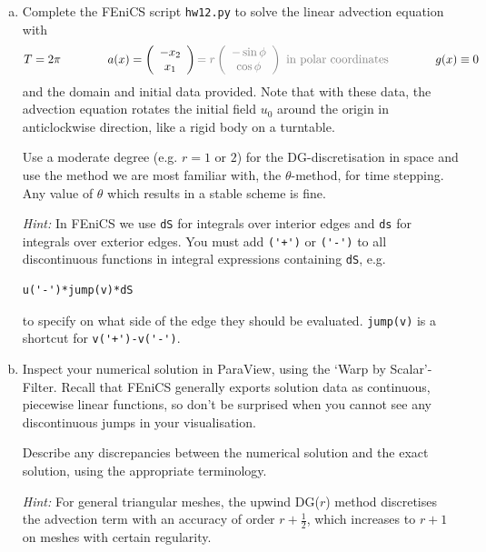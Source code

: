 \begin{enumerate}[(a)]
\newpage

\item Complete the \textsf{FEniCS} script \texttt{hw12.py} to solve the linear advection equation with
\begin{equation*}
T = 2\pi \qquad \qquad a(x) = \left(
\begin{array}{c}
-x_2\\ x_1
\end{array}
\right) \textcolor{gray}{ = r \left(
\begin{array}{c}
-\sin \phi \\ \cos \phi
\end{array}
\right)  \text{ in polar coordinates}}  \qquad \qquad  g(x) \equiv 0
\end{equation*}
and the domain and initial data provided. Note that with these data, the advection equation rotates the initial field $u_0$ around the origin in anticlockwise direction, like a rigid body on a turntable.

Use a moderate degree (e.g. $r=1$ or $2$) for the DG-discretisation in space and use the method we are most familiar with, the $\theta$-method, for time stepping. Any value of $\theta$ which results in a stable scheme is fine.

\emph{Hint:} In \textsf{FEniCS} we use \verb|dS| for integrals over interior edges and \verb|ds| for integrals over exterior edges. You must add \verb|('+')| or \verb|('-')| to all discontinuous functions in integral expressions containing \verb|dS|, e.g.
\begin{verbatim}
u('-')*jump(v)*dS
\end{verbatim}
to specify on what side of the edge they should be evaluated. \verb|jump(v)| is a shortcut for \verb|v('+')-v('-')|.

\item Inspect your numerical solution in \textsf{ParaView}, using the `Warp by Scalar'-Filter. Recall that \textsf{FEniCS} generally exports solution data as continuous, piecewise linear functions, so don't be surprised when you cannot see any discontinuous jumps in your visualisation.

Describe any discrepancies between the numerical solution and the exact solution, using the appropriate terminology.

\emph{Hint: } For general triangular meshes, the upwind DG($r$) method discretises the advection term with an accuracy of order $r+\frac{1}{2}$, which increases to $r+1$ on meshes with certain regularity.

\end{enumerate}

